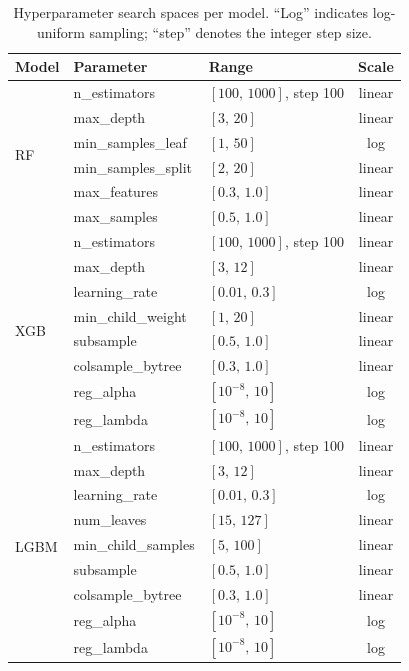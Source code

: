 \begin{table}[H]
\centering
\caption{Hyperparameter search spaces per model. ``Log'' indicates log-uniform sampling; ``step'' denotes the integer step size.}
\label{tab:tune_search_space}
\begin{tabular}{lllc}
\toprule
Model & Parameter & Range & Scale \\
\midrule
\multirow{6}{*}{RF}
  & n\_estimators      & $[100,\,1000]$, step 100 & linear \\
  & max\_depth         & $[3,\,20]$               & linear \\
  & min\_samples\_leaf & $[1,\,50]$               & log    \\
  & min\_samples\_split& $[2,\,20]$               & linear \\
  & max\_features      & $[0.3,\,1.0]$            & linear \\
  & max\_samples       & $[0.5,\,1.0]$            & linear \\
\midrule
\multirow{8}{*}{XGB}
  & n\_estimators      & $[100,\,1000]$, step 100 & linear \\
  & max\_depth         & $[3,\,12]$               & linear \\
  & learning\_rate     & $[0.01,\,0.3]$           & log    \\
  & min\_child\_weight & $[1,\,20]$               & linear \\
  & subsample          & $[0.5,\,1.0]$            & linear \\
  & colsample\_bytree  & $[0.3,\,1.0]$            & linear \\
  & reg\_alpha         & $[10^{-8},\,10]$         & log    \\
  & reg\_lambda        & $[10^{-8},\,10]$         & log    \\
\midrule
\multirow{9}{*}{LGBM}
  & n\_estimators      & $[100,\,1000]$, step 100 & linear \\
  & max\_depth         & $[3,\,12]$               & linear \\
  & learning\_rate     & $[0.01,\,0.3]$           & log    \\
  & num\_leaves        & $[15,\,127]$             & linear \\
  & min\_child\_samples& $[5,\,100]$              & linear \\
  & subsample          & $[0.5,\,1.0]$            & linear \\
  & colsample\_bytree  & $[0.3,\,1.0]$            & linear \\
  & reg\_alpha         & $[10^{-8},\,10]$         & log    \\
  & reg\_lambda        & $[10^{-8},\,10]$         & log    \\
\bottomrule
\end{tabular}
\end{table}

